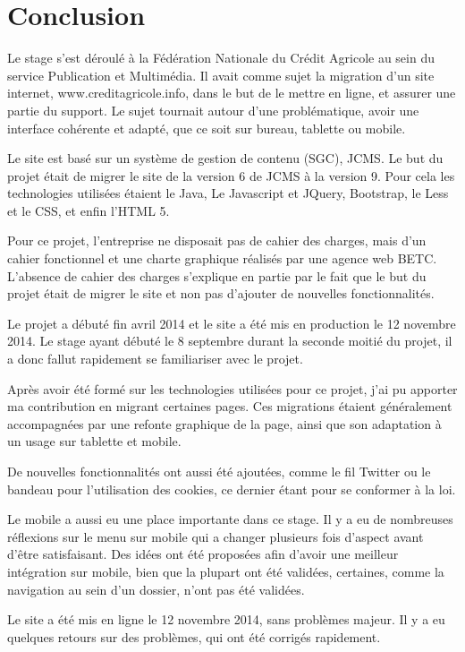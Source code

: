 \documentclass[12pt,a4paper]{article}
\begin{document}
\section{Conclusion}
Le stage s'est déroulé à la Fédération Nationale du Crédit Agricole au sein du service Publication et Multimédia. Il avait comme sujet la migration d'un site internet, www.creditagricole.info, dans le but de le mettre en ligne, et assurer une partie du support. Le sujet tournait autour d'une problématique, avoir une interface cohérente et adapté, que ce soit sur bureau, tablette ou mobile.\par 
Le site est basé sur un système de gestion de contenu (SGC), \gls{JCMS}. Le but du projet était de migrer le site de la version 6 de \gls{JCMS} à la version 9. Pour cela les technologies utilisées étaient le Java, Le Javascript et JQuery, Bootstrap, le Less et le \gls{CSS}, et enfin l'\gls{HTML} 5.\par 
Pour ce projet, l'entreprise ne disposait pas de cahier des charges, mais d'un cahier fonctionnel et une charte graphique réalisés par une agence web BETC. L'absence de cahier des charges s'explique en partie par le fait que le but du projet était de migrer le site et non pas d'ajouter de nouvelles fonctionnalités.\par
Le projet a débuté fin avril 2014 et le site a été mis en production le 12 novembre 2014. Le stage ayant débuté le 8 septembre durant la seconde moitié du projet, il a donc fallut rapidement se familiariser avec le projet.\par 
\medskip
Après avoir été formé sur les technologies utilisées pour ce projet, j'ai pu apporter ma contribution en migrant certaines pages. Ces migrations étaient généralement accompagnées par une refonte graphique de la page, ainsi que son adaptation à un usage sur tablette et mobile.\par 
De nouvelles fonctionnalités ont aussi été ajoutées, comme le fil Twitter ou le bandeau pour l'utilisation des cookies, ce dernier étant pour se conformer à la loi.\par 
Le mobile a aussi eu une place importante dans ce stage. Il y a eu de nombreuses réflexions sur le menu sur mobile qui a changer plusieurs fois d'aspect avant d'être satisfaisant. Des idées ont été proposées afin d'avoir une meilleur intégration sur mobile, bien que la plupart ont été validées, certaines, comme la navigation au sein d'un dossier, n'ont pas été validées.\par
Le site a été mis en ligne le 12 novembre 2014, sans problèmes majeur. Il y a eu quelques retours sur des problèmes, qui ont été corrigés rapidement.\par 
\end{document}

